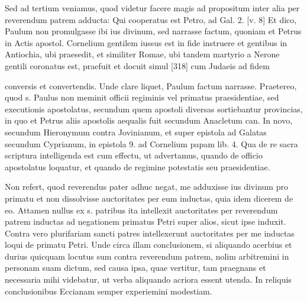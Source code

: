 Sed ad tertium veniamus, quod videtur facere magis ad propositum inter alia per reverendum patrem adducta: Qui cooperatus est Petro, ad Gal. 2. [v. 8] Et dico, Paulum non promulgasse ibi ius divinum, sed narrasse factum, quoniam et Petrus in Actis apostol. Cornelium gentilem iussus est in fide instruere et gentibus in Antiochia, ubi praesedit, et similiter Romae, ubi tandem martyrio a Nerone gentili coronatus est, praefuit et docuit simul [318] cum Judaeis ad fidem

conversis et convertendis. Unde clare liquet, Paulum factum narrasse. Praetereo, quod s. Paulus non meminit officii regiminis vel primatus praesidentiae, sed executionis apostolatus, secundum quem apostoli diversas sortiebantur provincias, in quo et Petrus aliis apostolis aequalis fuit secundum Anacletum can. In novo, secundum Hieronymum contra Jovinianum, et super epistola ad Galatas secundum Cyprianum, in epistola 9. ad Cornelium papam lib. 4. Qua de re sacra scriptura intelligenda est cum effectu, ut advertamus, quando de officio apostolatus loquatur, et quando de regimine potestatis seu praesidentiae.

Non refert, quod reverendus pater adhuc negat, me adduxisse ius divinum pro primatu et non dissolvisse auctoritates per eum inductas, quia idem dicerem de eo. Attamen nullus ex s. patribus ita intellexit auctoritates per reverendum patrem inductas ad negationem primatus Petri super alios, sicut ipse induxit. Contra vero plurifariam sancti patres intellexerunt auctoritates per me inductas loqui de primatu Petri. Unde circa illam conclusionem, si aliquando acerbius et durius quicquam locutus sum contra reverendum patrem, nolim arbitremini in personam suam dictum, sed causa ipsa, quae vertitur, tam praegnans et necessaria mihi videbatur, ut verba aliquando acriora essent utenda. In reliquis conclusionibus Eccianam semper experiemini modestiam.


